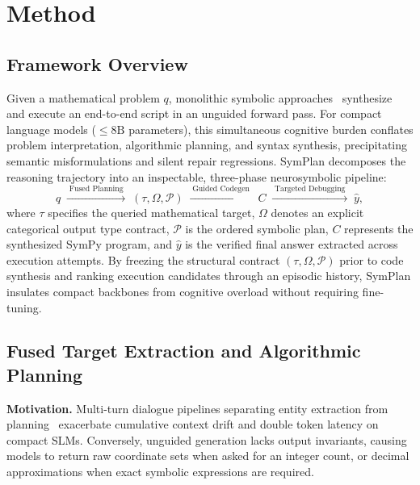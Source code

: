 \documentclass[runningheads]{llncs}
\begin{document}
\section{Method}
\label{sec:method}

\subsection{Framework Overview}

Given a mathematical problem $q$, monolithic symbolic approaches~\cite{nezhad2025symcode} synthesize and execute an end-to-end script in an unguided forward pass. For compact language models ($\le 8\text{B}$ parameters), this simultaneous cognitive burden conflates problem interpretation, algorithmic planning, and syntax synthesis, precipitating semantic misformulations and silent repair regressions. SymPlan decomposes the reasoning trajectory into an inspectable, three-phase neurosymbolic pipeline:
\begin{equation}
q \;\xrightarrow{\;\text{Fused Planning}\;}\; (\tau, \Omega, \mathcal{P}) \;\xrightarrow{\;\text{Guided Codegen}\;}\; C \;\xrightarrow{\;\text{Targeted Debugging}\;}\; \hat{y},
\label{eq:pipeline}
\end{equation}
where $\tau$ specifies the queried mathematical target, $\Omega$ denotes an explicit categorical output type contract, $\mathcal{P}$ is the ordered symbolic plan, $C$ represents the synthesized SymPy program, and $\hat{y}$ is the verified final answer extracted across execution attempts. By freezing the structural contract $(\tau, \Omega, \mathcal{P})$ prior to code synthesis and ranking execution candidates through an episodic history, SymPlan insulates compact backbones from cognitive overload without requiring fine-tuning.

\subsection{Fused Target Extraction and Algorithmic Planning}
\label{sec:fused_planning}

\textbf{Motivation.} Multi-turn dialogue pipelines separating entity extraction from planning~\cite{lyu2023faithful,khot2023decomposed} exacerbate cumulative context drift and double token latency on compact SLMs. Conversely, unguided generation lacks output invariants, causing models to return raw coordinate sets when asked for an integer count, or decimal approximations when exact symbolic expressions are required.
\end{document}

